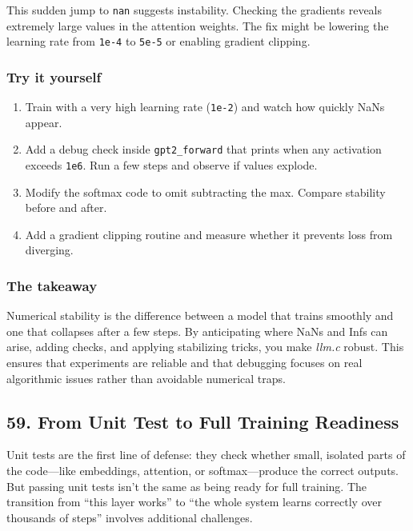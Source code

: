 \documentclass[
  letterpaper,
  DIV=11,
  numbers=noendperiod]{scrreprt}
\providecommand{\tightlist}{%
  \setlength{\itemsep}{0pt}\setlength{\parskip}{0pt}}
\begin{document}
This sudden jump to \texttt{nan} suggests instability. Checking the
gradients reveals extremely large values in the attention weights. The
fix might be lowering the learning rate from \texttt{1e-4} to
\texttt{5e-5} or enabling gradient clipping.

\subsubsection{Try it yourself}\label{try-it-yourself-46}

\begin{enumerate}
\def\labelenumi{\arabic{enumi}.}
\tightlist
\item
  Train with a very high learning rate (\texttt{1e-2}) and watch how
  quickly NaNs appear.
\item
  Add a debug check inside \texttt{gpt2\_forward} that prints when any
  activation exceeds \texttt{1e6}. Run a few steps and observe if values
  explode.
\item
  Modify the softmax code to omit subtracting the max. Compare stability
  before and after.
\item
  Add a gradient clipping routine and measure whether it prevents loss
  from diverging.
\end{enumerate}

\subsubsection{The takeaway}\label{the-takeaway-47}

Numerical stability is the difference between a model that trains
smoothly and one that collapses after a few steps. By anticipating where
NaNs and Infs can arise, adding checks, and applying stabilizing tricks,
you make \emph{llm.c} robust. This ensures that experiments are reliable
and that debugging focuses on real algorithmic issues rather than
avoidable numerical traps.

\subsection{59. From Unit Test to Full Training
Readiness}\label{from-unit-test-to-full-training-readiness}

Unit tests are the first line of defense: they check whether small,
isolated parts of the code---like embeddings, attention, or
softmax---produce the correct outputs. But passing unit tests isn't the
same as being ready for full training. The transition from ``this layer
works'' to ``the whole system learns correctly over thousands of steps''
involves additional challenges.
\end{document}
